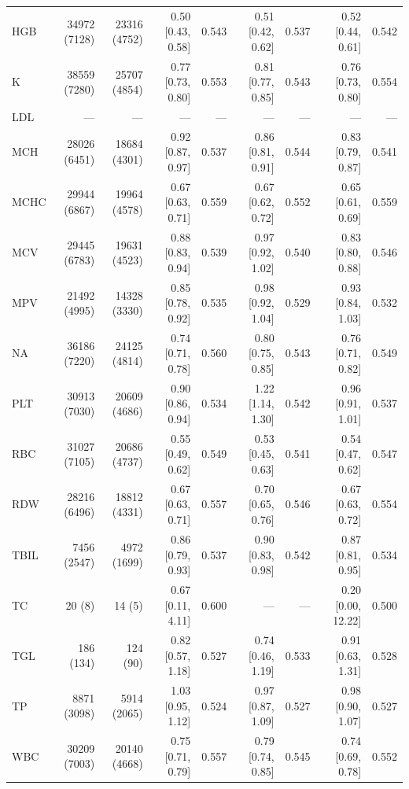 \begin{table}[ht]
\begin{tabular}{lrrrrrrrr}
HGB & 34972 (7128) & 23316 (4752) & 0.50 [0.43, 0.58] & 0.543 & 0.51 [0.42, 0.62] & 0.537 & 0.52 [0.44, 0.61] & 0.542 \\
K & 38559 (7280) & 25707 (4854) & 0.77 [0.73, 0.80] & 0.553 & 0.81 [0.77, 0.85] & 0.543 & 0.76 [0.73, 0.80] & 0.554 \\
LDL & --- & --- & --- & --- & --- & --- & --- & --- \\
MCH & 28026 (6451) & 18684 (4301) & 0.92 [0.87, 0.97] & 0.537 & 0.86 [0.81, 0.91] & 0.544 & 0.83 [0.79, 0.87] & 0.541 \\
MCHC & 29944 (6867) & 19964 (4578) & 0.67 [0.63, 0.71] & 0.559 & 0.67 [0.62, 0.72] & 0.552 & 0.65 [0.61, 0.69] & 0.559 \\
MCV & 29445 (6783) & 19631 (4523) & 0.88 [0.83, 0.94] & 0.539 & 0.97 [0.92, 1.02] & 0.540 & 0.83 [0.80, 0.88] & 0.546 \\
MPV & 21492 (4995) & 14328 (3330) & 0.85 [0.78, 0.92] & 0.535 & 0.98 [0.92, 1.04] & 0.529 & 0.93 [0.84, 1.03] & 0.532 \\
NA & 36186 (7220) & 24125 (4814) & 0.74 [0.71, 0.78] & 0.560 & 0.80 [0.75, 0.85] & 0.543 & 0.76 [0.71, 0.82] & 0.549 \\
PLT & 30913 (7030) & 20609 (4686) & 0.90 [0.86, 0.94] & 0.534 & 1.22 [1.14, 1.30] & 0.542 & 0.96 [0.91, 1.01] & 0.537 \\
RBC & 31027 (7105) & 20686 (4737) & 0.55 [0.49, 0.62] & 0.549 & 0.53 [0.45, 0.63] & 0.541 & 0.54 [0.47, 0.62] & 0.547 \\
RDW & 28216 (6496) & 18812 (4331) & 0.67 [0.63, 0.71] & 0.557 & 0.70 [0.65, 0.76] & 0.546 & 0.67 [0.63, 0.72] & 0.554 \\
TBIL & 7456 (2547) & 4972 (1699) & 0.86 [0.79, 0.93] & 0.537 & 0.90 [0.83, 0.98] & 0.542 & 0.87 [0.81, 0.95] & 0.534 \\
TC & 20 (8) & 14 (5) & 0.67 [0.11, 4.11] & 0.600 & --- & --- & 0.20 [0.00, 12.22] & 0.500 \\
TGL & 186 (134) & 124 (90) & 0.82 [0.57, 1.18] & 0.527 & 0.74 [0.46, 1.19] & 0.533 & 0.91 [0.63, 1.31] & 0.528 \\
TP & 8871 (3098) & 5914 (2065) & 1.03 [0.95, 1.12] & 0.524 & 0.97 [0.87, 1.09] & 0.527 & 0.98 [0.90, 1.07] & 0.527 \\
WBC & 30209 (7003) & 20140 (4668) & 0.75 [0.71, 0.79] & 0.557 & 0.79 [0.74, 0.85] & 0.545 & 0.74 [0.69, 0.78] & 0.552 \\
\bottomrule
\end{tabular}
\label{tab:eicu_cox_prolonged_los}
\end{table}